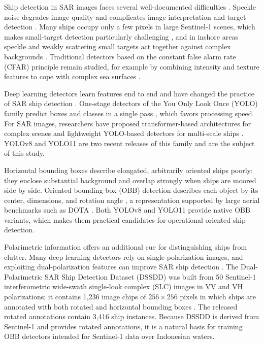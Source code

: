 \documentclass[conference]{IEEEtran}
\begin{document}
Ship detection in SAR images faces several well-documented difficulties \cite{li2022review}. Speckle noise degrades image quality and complicates image interpretation and target detection \cite{zhang2023speckle}. Many ships occupy only a few pixels in large Sentinel-1 scenes, which makes small-target detection particularly challenging \cite{zhang2020lsssdd}, and in inshore areas speckle and weakly scattering small targets act together against complex backgrounds \cite{yao2026fsmd}. Traditional detectors based on the constant false alarm rate (CFAR) principle remain studied, for example by combining intensity and texture features to cope with complex sea surfaces \cite{li2022cfar}.

Deep learning detectors learn features end to end and have changed the practice of SAR ship detection \cite{li2022review}. One-stage detectors of the You Only Look Once (YOLO) family predict boxes and classes in a single pass \cite{redmon2016}, which favors processing speed. For SAR images, researchers have proposed transformer-based architectures for complex scenes \cite{yu2025smep} and lightweight YOLO-based detectors for multi-scale ships \cite{guo2022lmsd}. YOLOv8 \cite{yolov8} and YOLO11 \cite{yolo11} are two recent releases of this family and are the subject of this study.

Horizontal bounding boxes describe elongated, arbitrarily oriented ships poorly: they enclose substantial background and overlap strongly when ships are moored side by side. Oriented bounding box (OBB) detection describes each object by its center, dimensions, and rotation angle \cite{he2024rotsurvey}, a representation supported by large aerial benchmarks such as DOTA \cite{xia2018dota}. Both YOLOv8 and YOLO11 provide native OBB variants, which makes them practical candidates for operational oriented ship detection.

Polarimetric information offers an additional cue for distinguishing ships from clutter. Many deep learning detectors rely on single-polarization images, and exploiting dual-polarization features can improve SAR ship detection \cite{xu2022gwfef}. The Dual-Polarimetric SAR Ship Detection Dataset (DSSDD) was built from 50 Sentinel-1 interferometric wide-swath single-look complex (SLC) images in VV and VH polarizations; it contains 1,236 image chips of $256 \times 256$ pixels in which ships are annotated with both rotated and horizontal bounding boxes \cite{hu2021dssdd}. The released rotated annotations contain 3,416 ship instances. Because DSSDD is derived from Sentinel-1 and provides rotated annotations, it is a natural basis for training OBB detectors intended for Sentinel-1 data over Indonesian waters.
\end{document}
